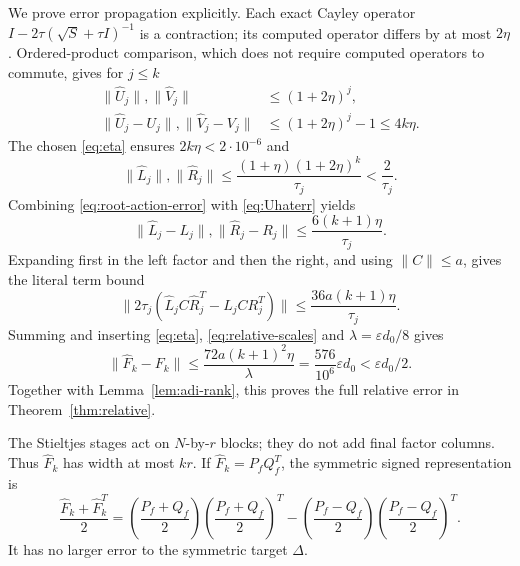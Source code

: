 \documentclass[11pt]{article}
\numberwithin{equation}{section}
\begin{document}
We prove error propagation explicitly. Each exact Cayley operator
$I-2\tau(\sqrt S+\tau I)^{-1}$ is a contraction; its computed operator
differs by at most $2\eta$. Ordered-product comparison, which does
not require computed operators to commute, gives for $j\le k$
\begin{align}
 \|\widehat U_j\|,\|\widehat V_j\|&\le(1+2\eta)^j,\label{eq:Uhatnorm}\\
 \|\widehat U_j-U_j\|,\|\widehat V_j-V_j\|
     &\le(1+2\eta)^j-1\le4k\eta.\label{eq:Uhaterr}
\end{align}
The chosen \eqref{eq:eta} ensures $2k\eta<2\cdot10^{-6}$ and
\begin{equation}\label{eq:strongfactor}
 \|\widehat L_j\|,\|\widehat R_j\|
 \le\frac{(1+\eta)(1+2\eta)^k}{\tau_j}<\frac2{\tau_j}.
\end{equation}
Combining \eqref{eq:root-action-error} with \eqref{eq:Uhaterr} yields
\begin{equation}\label{eq:factor-error}
 \|\widehat L_j-L_j\|,\|\widehat R_j-R_j\|
                         \le\frac{6(k+1)\eta}{\tau_j}.
\end{equation}
Expanding first in the left factor and then the right, and using
$\|C\|\le a$, gives the literal term bound
\[
 \|2\tau_j(\widehat L_jC\widehat R_j^T-L_jCR_j^T)\|
                 \le\frac{36a(k+1)\eta}{\tau_j}.
\]
Summing and inserting \eqref{eq:eta}, \eqref{eq:relative-scales} and
$\lambda=\varepsilon d_0/8$ gives
\begin{equation}\label{eq:ADI-inexact-error}
 \|\widehat F_k-F_k\|
 \le\frac{72a(k+1)^2\eta}{\lambda}
 =\frac{576}{10^6}\varepsilon d_0<\varepsilon d_0/2.
\end{equation}
Together with Lemma~\ref{lem:adi-rank}, this proves the full relative
error in Theorem~\ref{thm:relative}.

The Stieltjes stages act on $N$-by-$r$ blocks; they do not add final
factor columns. Thus $\widehat F_k$ has width at most $kr$. If
$\widehat F_k=P_fQ_f^T$, the symmetric signed representation is
\begin{equation}\label{eq:sym}
 \frac{\widehat F_k+\widehat F_k^T}{2}
 =\left(\frac{P_f+Q_f}{2}\right)
       \left(\frac{P_f+Q_f}{2}\right)^T
  -\left(\frac{P_f-Q_f}{2}\right)
       \left(\frac{P_f-Q_f}{2}\right)^T.
\end{equation}
It has no larger error to the symmetric target $\Delta$.
\end{document}
